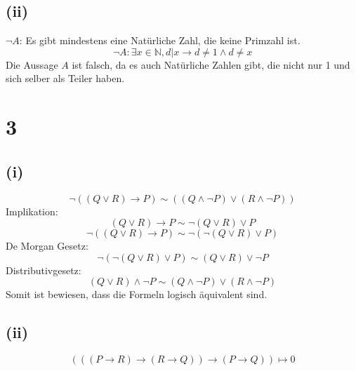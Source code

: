 \documentclass{article}
\begin{document}
\subsection{(ii)}
$\neg A$: Es gibt mindestens eine Natürliche Zahl, die keine Primzahl ist.
\[\neg A: \exists x \in \mathbb{N}, d|x \to d \neq 1 \land d \neq x\]
Die Aussage $A$ ist falsch, da es auch Natürliche Zahlen gibt, die nicht nur 1 und sich selber als Teiler haben.

\section{3}
\subsection{(i)}
\[\neg((Q \lor R) \to P) \sim ((Q \land \neg P) \lor (R \land \neg P))\]
Implikation:
\[(Q \lor R) \to P \sim \neg(Q \lor R) \lor P\]
\[\neg((Q \lor R) \to P) \sim \neg(\neg(Q \lor R) \lor P)\]
De Morgan Gesetz:
\[\neg(\neg(Q \lor R) \lor P) \sim (Q \lor R) \lor \neg P\]
Distributivgesetz:
\[(Q \lor R) \land \neg P \sim (Q \land \neg P) \lor (R \land \neg P)\]
Somit ist bewiesen, dass die Formeln logisch äquivalent sind.

\subsection{(ii)}
\[\left( ((P \to R) \to (R \to Q)) \to (P \to Q) \right) \mapsto 0\]
\end{document}
